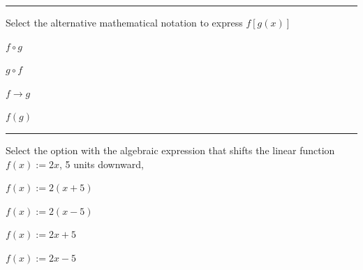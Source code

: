 \begin{preguntas}
\pregunta[5] \rule{1cm}{0.1mm} Select the alternative mathematical notation to express $f[g(x)]$

\begin{enumerate*}[label=(\alph*)]
    \item $f\circ g\qquad$
    \item $g\circ f\qquad$
    \item $f\to g\qquad$
    \item $f(g)\qquad$
\end{enumerate*}

\pregunta[5] \rule{1cm}{0.1mm} Select the option with the algebraic expression that shifts the linear function $f(x):=2x$, 5 units downward,

\begin{enumerate*}[label=(\alph*)]
    \item $f(x):=2(x+5)\qquad$
    \item $f(x):=2(x-5)\qquad$
    \item $f(x):=2x+5\qquad$
    \item $f(x):=2x-5\qquad$
\end{enumerate*}


\end{preguntas}



